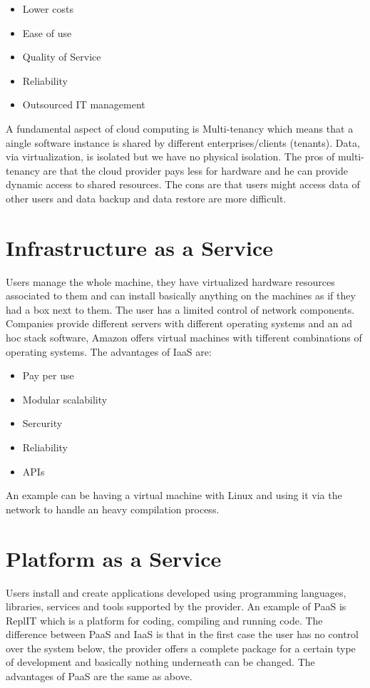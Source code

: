 \begin{itemize}
    \item Lower costs
    \item Ease of use
    \item Quality of Service
    \item Reliability
    \item Outsourced IT management
\end{itemize}
A fundamental aspect of cloud computing is Multi-tenancy which means that a aingle software instance is shared by different enterprises/clients (tenants). Data, via virtualization, is isolated but we have no physical isolation. \n
The pros of multi-tenancy are that the cloud provider pays less for hardware and he can provide dynamic access to shared resources. \n
The cons are that users might access data of other users and data backup and data restore are more difficult.
\section{Infrastructure as a Service}
Users manage the whole machine, they have virtualized hardware resources associated to them and can install basically anything on the machines as if they had a box next to them. The user has a limited control of network components. \n
Companies provide different servers with different operating systems and an ad hoc stack software, Amazon offers virtual machines with tifferent combinations of operating systems. \n
The advantages of IaaS are:
\begin{itemize}
    \item Pay per use
    \item Modular scalability
    \item Sercurity
    \item Reliability
    \item APIs
\end{itemize}
An example can be having a virtual machine with Linux and using it via the network to handle an heavy compilation process.
\section{Platform as a Service}
Users install and create applications developed using programming languages, libraries, services and tools supported by the provider. \n
An example of PaaS is ReplIT which is a platform for coding, compiling and running code. The difference between PaaS and IaaS is that in the first case the user has no control over the system below, the provider offers a complete package for a certain type of development and basically nothing underneath can be changed. \n
The advantages of PaaS are the same as above.
